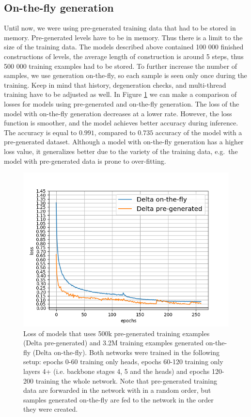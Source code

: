 \subsection{On-the-fly generation}
\label{on_the_fly_section}
Until now, we were using pre-generated training data that had to be stored in memory. Pre-generated levels have to be in memory. Thus there is a limit to the size of the training data. The models described above contained 100 000 finished constructions of levels, the average length of construction is around 5 steps, thus 500 000 training examples had to be stored. To further increase the number of samples, we use generation on-the-fly, so each sample is seen only once during the training. Keep in mind that history, degeneration checks, and multi-thread training have to be adjusted as well. In Figure \ref{on_the_fly_gen_loss}
we can make a comparison of losses for models using pre-generated and on-the-fly generation. The loss of the model with on-the-fly generation decreases at a lower rate. However, the loss function is smoother, and the model achieves better accuracy during inference. The accuracy is equal to $0.991$, compared to $0.735$ accuracy of the model with a pre-generated dataset. Although a model with on-the-fly generation has a higher loss value, it generalizes better due to the variety of the training data, e.g.~the model with pre-generated data is prone to over-fitting.
\begin{figure}[h]
\centering
\includegraphics[width=\textwidth]{img/on-the-fly-gen.png}
\caption{Loss of models that uses 500k pre-generated training examples (Delta pre-generated) and 3.2M training examples generated on-the-fly (Delta on-the-fly).  Both networks were trained in the following setup: epochs 0-60 training only heads, epochs 60-120 training only layers 4+ (i.e. backbone stages 4, 5 and the heads) and epochs 120-200 training the whole network. Note that pre-generated training data are forwarded in the network with in a random order, but samples generated on-the-fly are fed to the network in the order they were created.}
\label{on_the_fly_gen_loss}
\end{figure}
